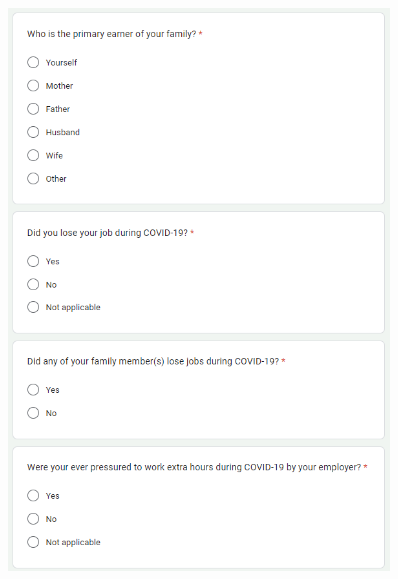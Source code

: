 \documentclass[12pt, english]{article}
\begin{document}
\begin{figure}[h]
    \centering
    \begin{minipage}{0.45\textwidth}
        \centering
        \includegraphics[width=0.9\textwidth]{images/lifestyle_3.png} %


\end{minipage}
\end{figure}
\end{document}
